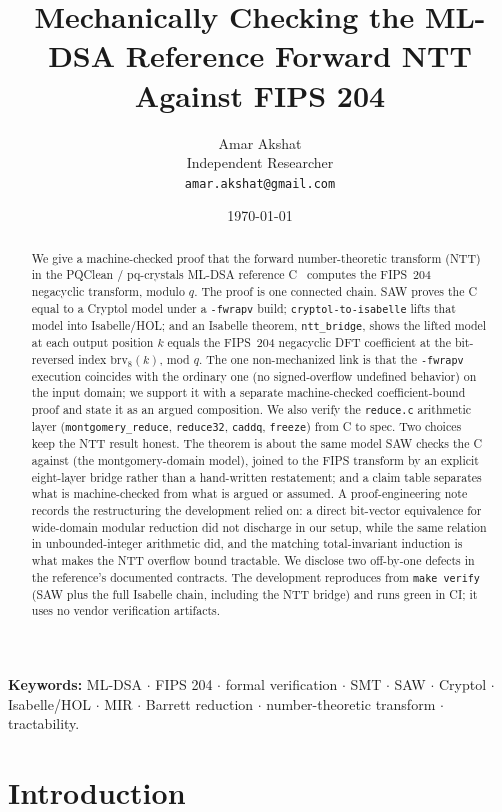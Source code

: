 \documentclass[11pt]{article}
\title{Mechanically Checking the ML-DSA Reference Forward NTT\\
       Against FIPS 204}
\author{Amar Akshat\\Independent Researcher\\\texttt{amar.akshat@gmail.com}}
\date{\today}
\newcommand{\code}[1]{\texttt{#1}}
\begin{document}
\maketitle

\begin{abstract}
We give a machine-checked proof that the forward number-theoretic transform (NTT) in the
PQClean / pq-crystals ML-DSA reference C~\cite{pqclean,dilithiumref} computes the FIPS~204~\cite{fips204}
negacyclic transform, modulo $q$. The proof is one connected chain. SAW proves the C equal to a Cryptol
model under a \code{-fwrapv} build; \code{cryptol-to-isabelle} lifts that model into Isabelle/HOL; and an
Isabelle theorem, \code{ntt\_bridge}, shows the lifted model at each output position $k$ equals the
FIPS~204 negacyclic DFT coefficient at the bit-reversed index $\mathrm{brv}_8(k)$, mod $q$. The one
non-mechanized link is that the \code{-fwrapv} execution coincides with the ordinary one (no
signed-overflow undefined behavior) on the input domain; we support it with a separate machine-checked
coefficient-bound proof and state it as an argued composition. We also verify the \code{reduce.c}
arithmetic layer (\code{montgomery\_reduce}, \code{reduce32}, \code{caddq}, \code{freeze}) from C to
spec. Two choices keep the NTT result honest. The theorem is about the same model SAW checks the C
against (the montgomery-domain model), joined to the FIPS transform by an explicit eight-layer bridge
rather than a hand-written restatement; and a claim table separates what is machine-checked from what is
argued or assumed. A proof-engineering note records the restructuring the development relied on: a direct
bit-vector equivalence for wide-domain modular reduction did not discharge in our setup, while the same
relation in unbounded-integer arithmetic did, and the matching total-invariant induction is what makes
the NTT overflow bound tractable. We disclose two off-by-one defects in the reference's documented
contracts. The development reproduces from \code{make verify} (SAW plus the full Isabelle chain,
including the NTT bridge) and runs green in CI; it uses no vendor verification artifacts.
\end{abstract}

\medskip
\noindent\textbf{Keywords:} ML-DSA $\cdot$ FIPS 204 $\cdot$ formal verification $\cdot$ SMT
$\cdot$ SAW $\cdot$ Cryptol $\cdot$ Isabelle/HOL $\cdot$ MIR $\cdot$ Barrett reduction $\cdot$
number-theoretic transform $\cdot$ tractability.

\section{Introduction}\label{sec:intro}
\end{document}
